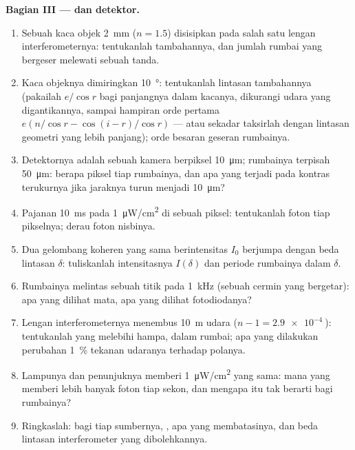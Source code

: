 \begin{problem}
\medskip
\noindent\textbf{Bagian III ---  dan detektor.}
\begin{enumerate}[resume]
  \item Sebuah kaca objek \qty{2}{mm} ($n = 1.5$) disisipkan pada salah satu lengan
        interferometernya: tentukanlah  tambahannya, dan jumlah
        rumbai yang bergeser melewati sebuah tanda.
  \item Kaca objeknya dimiringkan \qty{10}{\degree}: tentukanlah lintasan tambahannya (pakailah $e/\cos r$
        bagi panjangnya dalam kacanya, dikurangi udara yang digantikannya, sampai
        hampiran orde pertama $e(n/\cos r - \cos(i - r)/\cos r)$ --- atau sekadar
        taksirlah dengan lintasan geometri yang lebih panjang); orde besaran
        geseran rumbainya.
  \item Detektornya adalah sebuah kamera berpiksel \qty{10}{\micro m}; rumbainya
        terpisah \qty{50}{\micro m}: berapa piksel tiap rumbainya, dan apa yang
        terjadi pada kontras terukurnya jika jaraknya turun menjadi
        \qty{10}{\micro m}?
  \item Pajanan \qty{10}{ms} pada \qty{1}{\micro W/cm^2} di sebuah piksel: tentukanlah foton tiap
        pikselnya; derau foton nisbinya.
  \item Dua gelombang koheren yang sama berintensitas $I_0$ berjumpa dengan beda
        lintasan $\delta$: tuliskanlah intensitasnya $I(\delta)$ dan periode
        rumbainya dalam $\delta$.
  \item Rumbainya melintas sebuah titik pada \qty{1}{kHz} (sebuah cermin yang
        bergetar): apa yang dilihat mata, apa yang dilihat fotodiodanya?
  \item Lengan interferometernya menembus \qty{10}{m} udara ($n - 1 =
        \qty{2.9e-4}{}$): tentukanlah  yang melebihi hampa, dalam rumbai;
        apa yang dilakukan perubahan \qty{1}{\%} tekanan udaranya terhadap polanya.
  \item Lampunya dan penunjuknya memberi \qty{1}{\micro W/cm^2} yang sama: mana
        yang memberi lebih banyak foton tiap sekon, dan mengapa itu tak berarti bagi
        rumbainya?
  \item Ringkaslah: bagi tiap sumbernya, , apa yang membatasinya,
        dan beda lintasan interferometer yang dibolehkannya.
\end{enumerate}
\end{problem}
